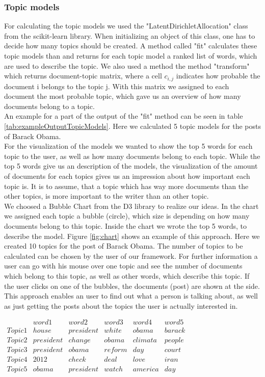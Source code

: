 \subsubsection{Topic models}
For calculating the topic models we used the "LatentDirichletAllocation" class from the scikit-learn library. When initializing an object of this class, one has to  decide how many topics should be created. A method called "fit" calculates these topic models than and returns for each topic model a ranked list of words, which are used to describe the topic. We also used a method the method "transform" which returns 
document-topic matrix, where a cell $ c_{i,j} $ indicates how probable the document i belongs to the topic j. With this matrix we assigned to each document the most probable topic, which gave us an overview of how many documents belong to a topic.  \\
An example for a part of the  output of the "fit" method can be seen in table \ref{tab:exampleOutputTopicModels}. Here we calculated 5 topic models for the posts of Barack Obama. \\
For the visualization of the models we wanted to show the top 5 words for each topic to the user, as well as how many documents belong to each topic. While the top 5 words give us an description of the models, the visualization of the amount of documents for each topics gives us an impression about how important each topic is. It is to assume, that a topic which has way more documents than the other topics, is more important to the writer than an other topic. \\
We choosed a Bubble Chart from the D3 library to realize our ideas. In the chart we assigned each topic a bubble (circle), which size is depending on how many documents belong to this topic. Inside the chart we wrote the top 5 words, to describe the model. Figure \ref{fig:chart} shows an example of this approach. Here we created 10 topics for the post of Barack Obama. The number of topics to be calculated can be chosen by the user of our framework. For further information a user can go with his mouse over one topic and see the number of documents which belong to this topic, as well as other words, which describe this topic. If the user clicks on one of the bubbles, the documents (post) are shown at the side. This approach enables an user to find out what a person is talking about, as well as just getting the posts about the topics the user is actually interested in. 

$\begin{array}{c|c|c|c|c|c}
& word 1 & word  2 & word 3 & word 4 & word 5 \\ 
\hline
Topic 1 & house & president &  white &  obama &  barack \\ 
\hline
Topic 2 & president  & change  & obama  & climata  & people  \\ 
\hline
Topic 3 & president & obama  & reform  &  day  & court  \\ 
\hline
Topic 4 & 2012   &  check  &  deal & love  &  iran \\ 
\hline
Topic 5 &  obama & president  & watch   & america  &  day
\label{tab:exampleOutputTopicModels}
\end{array} $




